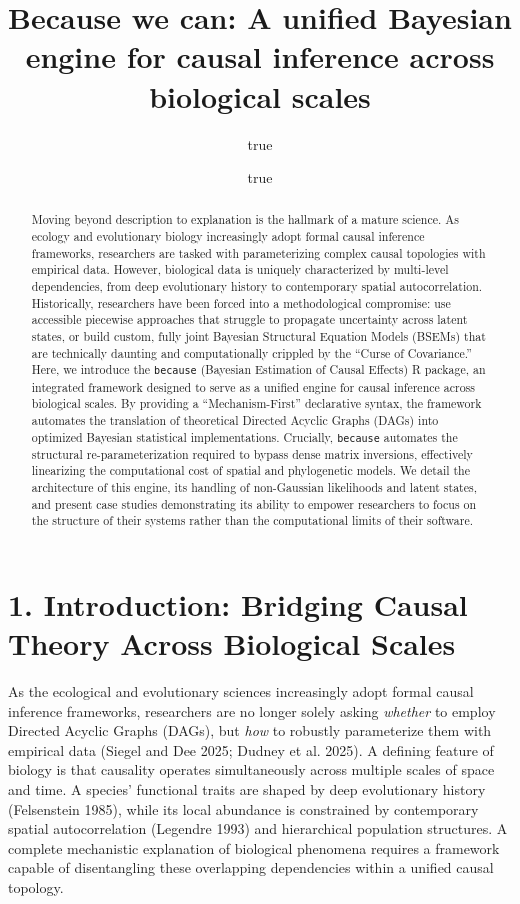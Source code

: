 \documentclass[
]{article}
\title{Because we can: A unified Bayesian engine for causal inference across biological scales}
\author{true \and true}
\date{}
\begin{document}
\maketitle
\begin{abstract}
Moving beyond description to explanation is the hallmark of a mature science. As ecology and evolutionary biology increasingly adopt formal causal inference frameworks, researchers are tasked with parameterizing complex causal topologies with empirical data. However, biological data is uniquely characterized by multi-level dependencies, from deep evolutionary history to contemporary spatial autocorrelation. Historically, researchers have been forced into a methodological compromise: use accessible piecewise approaches that struggle to propagate uncertainty across latent states, or build custom, fully joint Bayesian Structural Equation Models (BSEMs) that are technically daunting and computationally crippled by the ``Curse of Covariance.'' Here, we introduce the \texttt{because} (Bayesian Estimation of Causal Effects) R package, an integrated framework designed to serve as a unified engine for causal inference across biological scales. By providing a ``Mechanism-First'' declarative syntax, the framework automates the translation of theoretical Directed Acyclic Graphs (DAGs) into optimized Bayesian statistical implementations. Crucially, \texttt{because} automates the structural re-parameterization required to bypass dense matrix inversions, effectively linearizing the computational cost of spatial and phylogenetic models. We detail the architecture of this engine, its handling of non-Gaussian likelihoods and latent states, and present case studies demonstrating its ability to empower researchers to focus on the structure of their systems rather than the computational limits of their software.
\end{abstract}

\section{1. Introduction: Bridging Causal Theory Across Biological Scales}\label{introduction-bridging-causal-theory-across-biological-scales}

As the ecological and evolutionary sciences increasingly adopt formal causal inference frameworks, researchers are no longer solely asking \emph{whether} to employ Directed Acyclic Graphs (DAGs), but \emph{how} to robustly parameterize them with empirical data (Siegel and Dee 2025; Dudney et al. 2025). A defining feature of biology is that causality operates simultaneously across multiple scales of space and time. A species' functional traits are shaped by deep evolutionary history (Felsenstein 1985), while its local abundance is constrained by contemporary spatial autocorrelation (Legendre 1993) and hierarchical population structures. A complete mechanistic explanation of biological phenomena requires a framework capable of disentangling these overlapping dependencies within a unified causal topology.
\end{document}
